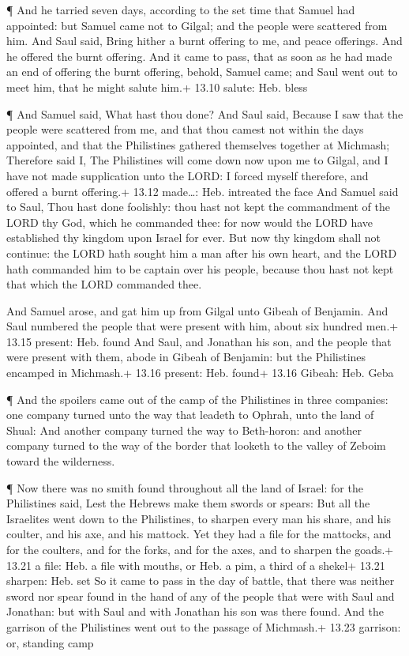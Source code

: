  ¶ And he tarried seven days, according to the set time that
Samuel had appointed: but Samuel came not to Gilgal; and the people were
scattered from him.  And Saul said, Bring hither a burnt
offering to me, and peace offerings. And he offered the burnt offering.
 And it came to pass, that as soon as he had made an end of
offering the burnt offering, behold, Samuel came; and Saul went out to
meet him, that he might salute him.+ 13.10 salute: Heb. bless

 ¶ And Samuel said, What hast thou done? And Saul said,
Because I saw that the people were scattered from me, and that thou
camest not within the days appointed, and that the Philistines gathered
themselves together at Michmash;  Therefore said I, The
Philistines will come down now upon me to Gilgal, and I have not made
supplication unto the LORD: I forced myself therefore, and offered a
burnt offering.+ 13.12 made\ldots: Heb. intreated the face 
And Samuel said to Saul, Thou hast done foolishly: thou hast not kept
the commandment of the LORD thy God, which he commanded thee: for now
would the LORD have established thy kingdom upon Israel for ever.
 But now thy kingdom shall not continue: the LORD hath
sought him a man after his own heart, and the LORD hath commanded him to
be captain over his people, because thou hast not kept that which the
LORD commanded thee.

 And Samuel arose, and gat him up from Gilgal unto Gibeah
of Benjamin. And Saul numbered the people that were present with him,
about six hundred men.+ 13.15 present: Heb. found  And
Saul, and Jonathan his son, and the people that were present with them,
abode in Gibeah of Benjamin: but the Philistines encamped in Michmash.+
13.16 present: Heb. found+ 13.16 Gibeah: Heb. Geba

 ¶ And the spoilers came out of the camp of the Philistines
in three companies: one company turned unto the way that leadeth to
Ophrah, unto the land of Shual:  And another company turned
the way to Beth-horon: and another company turned to the way of the
border that looketh to the valley of Zeboim toward the wilderness.

 ¶ Now there was no smith found throughout all the land of
Israel: for the Philistines said, Lest the Hebrews make them swords or
spears:  But all the Israelites went down to the
Philistines, to sharpen every man his share, and his coulter, and his
axe, and his mattock.  Yet they had a file for the
mattocks, and for the coulters, and for the forks, and for the axes, and
to sharpen the goads.+ 13.21 a file: Heb. a file with mouths, or Heb. a
pim, a third of a shekel+ 13.21 sharpen: Heb. set  So it
came to pass in the day of battle, that there was neither sword nor
spear found in the hand of any of the people that were with Saul and
Jonathan: but with Saul and with Jonathan his son was there found.
 And the garrison of the Philistines went out to the
passage of Michmash.+ 13.23 garrison: or, standing camp

